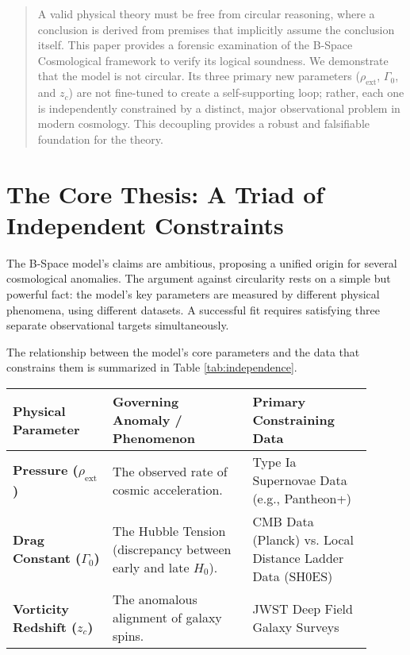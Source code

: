 \documentclass{BSpacePaper} %
\begin{document}
\makeBSCSsupplementtitle

\begin{abstract}
\noindent
A valid physical theory must be free from circular reasoning, where a conclusion is derived from premises that implicitly assume the conclusion itself. This paper provides a forensic examination of the B-Space Cosmological framework to verify its logical soundness. We demonstrate that the model is not circular. Its three primary new parameters ($\rho_{\text{ext}}$, $\Gamma_0$, and $z_c$) are not fine-tuned to create a self-supporting loop; rather, each one is independently constrained by a distinct, major observational problem in modern cosmology. This decoupling provides a robust and falsifiable foundation for the theory.
\end{abstract}

\section{The Core Thesis: A Triad of Independent Constraints}
The B-Space model's claims are ambitious, proposing a unified origin for several cosmological anomalies. The argument against circularity rests on a simple but powerful fact: the model's key parameters are measured by different physical phenomena, using different datasets. A successful fit requires satisfying three separate observational targets simultaneously.

The relationship between the model's core parameters and the data that constrains them is summarized in Table \ref{tab:independence}.

\begin{center}
    \captionsetup{type=table}
    \label{tab:independence}
    \begin{tabular}{@{}>{\raggedright}p{0.25\linewidth} >{\raggedright}p{0.35\linewidth} >{\raggedright\arraybackslash}p{0.3\linewidth}@{}}
    \toprule
    \textbf{Physical Parameter} & \textbf{Governing Anomaly / Phenomenon} & \textbf{Primary Constraining Data} \\
    \midrule
    \textbf{Pressure ($\rho_{\text{ext}}$)} & The observed rate of cosmic acceleration. & Type Ia Supernovae Data (e.g., Pantheon+) \\
    \addlinespace
    \textbf{Drag Constant ($\Gamma_0$)} & The Hubble Tension (discrepancy between early and late $H_0$). & CMB Data (Planck) vs. Local Distance Ladder Data (SH0ES) \\
    \addlinespace
    \textbf{Vorticity Redshift ($z_c$)} & The anomalous alignment of galaxy spins. & JWST Deep Field Galaxy Surveys \\
    \bottomrule
    \end{tabular}
\end{center}
\end{document}
